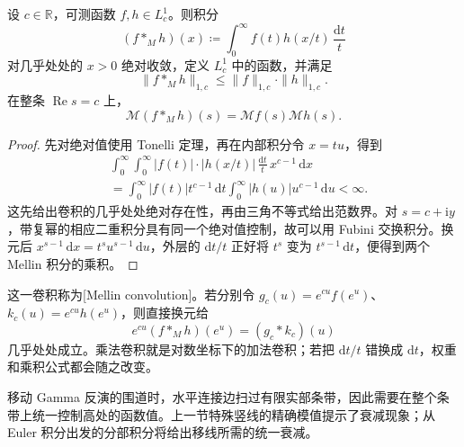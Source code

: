\begin{proposition}[Mellin 卷积]\label{b3:prop:21-mellin-convolution}
设 \(c\in\mathbb R\)，可测函数 \(f,h\in L^1_c\)。则积分
\[
 (f*_M h)(x)\coloneqq\int_0^\infty f(t)h(x/t)\,\frac{\mathrm dt}{t}
\]
对几乎处处的 \(x>0\) 绝对收敛，定义 \(L^1_c\) 中的函数，并满足
\[
 \|f*_M h\|_{1,c}\le\|f\|_{1,c}\cdot\|h\|_{1,c}.
\]
在整条 \(\operatorname{Re}s=c\) 上，
\begin{equation}\label{b3:eq:21-mellin-convolution}
 \mathcal M(f*_M h)(s)=\mathcal Mf(s)\mathcal Mh(s).
\end{equation}
\end{proposition}
\begin{proof}
先对绝对值使用 Tonelli 定理，再在内部积分令 \(x=tu\)，得到
\[
 \begin{aligned}
 &\int_0^\infty\int_0^\infty
       |f(t)|\cdot|h(x/t)|\,\frac{\mathrm dt}{t}\,x^{c-1}\,\mathrm dx\\
 &=\int_0^\infty|f(t)|t^{c-1}\,\mathrm dt
        \int_0^\infty|h(u)|u^{c-1}\,\mathrm du<\infty.
 \end{aligned}
\]
这先给出卷积的几乎处处绝对存在性，再由三角不等式给出范数界。对 \(s=c+\mathrm iy\)，带复幂的相应二重积分具有同一个绝对值控制，故可以用 Fubini 交换积分。换元后 \(x^{s-1}\,\mathrm dx=t^su^{s-1}\,\mathrm du\)，外层的 \(\mathrm dt/t\) 正好将 \(t^s\) 变为 \(t^{s-1}\,\mathrm dt\)，便得到两个 Mellin 积分的乘积。
\end{proof}

这一卷积称为[Mellin convolution]。若分别令 \(g_c(u)=e^{cu}f(e^u)\)、\(k_c(u)=e^{cu}h(e^u)\)，则直接换元给
\[
 e^{cu}(f*_Mh)(e^u)=(g_c*k_c)(u)
\]
几乎处处成立。乘法卷积就是对数坐标下的加法卷积；若把 \(\mathrm dt/t\) 错换成 \(\mathrm dt\)，权重和乘积公式都会随之改变。

\ProseParagraphBreak

移动 Gamma 反演的围道时，水平连接边扫过有限实部条带，因此需要在整个条带上统一控制高处的函数值。上一节特殊竖线的精确模值提示了衰减现象；从 Euler 积分出发的分部积分将给出移线所需的统一衰减。

